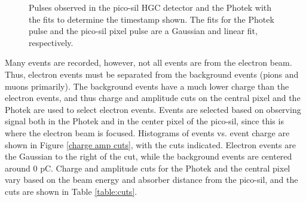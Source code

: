 \documentclass[twocolumn,aps,prd,reprint]{revtex4-1}
\begin{document}
\begin{figure}[!htbp]
\caption{Pulses observed in the pico-sil HGC detector and the Photek with the fits to determine the timestamp shown. The fits for the Photek pulse and the pico-sil pixel pulse are a Gaussian and linear fit, respectively.}
\label{timestamp}
\end{figure}

Many events are recorded, however, not all events are from the electron beam. Thus, electron events must be separated from the background events (pions and muons primarily). The background events have a much lower charge than the electron events, and thus charge and amplitude cuts on the central pixel and the Photek are used to select electron events. Events are selected based on observing signal both in the Photek and in the center pixel of the pico-sil, since this is where the electron beam is focused. Histograms of events vs. event charge are shown in Figure \ref{charge amp cuts}, with the cuts indicated. Electron events are the Gaussian to the right of the cut, while the background events are centered around 0 pC. Charge and amplitude cuts for the Photek and the central pixel vary based on the beam energy and absorber distance from the pico-sil, and the cuts are shown in Table \ref{table:cuts}.
\end{document}
